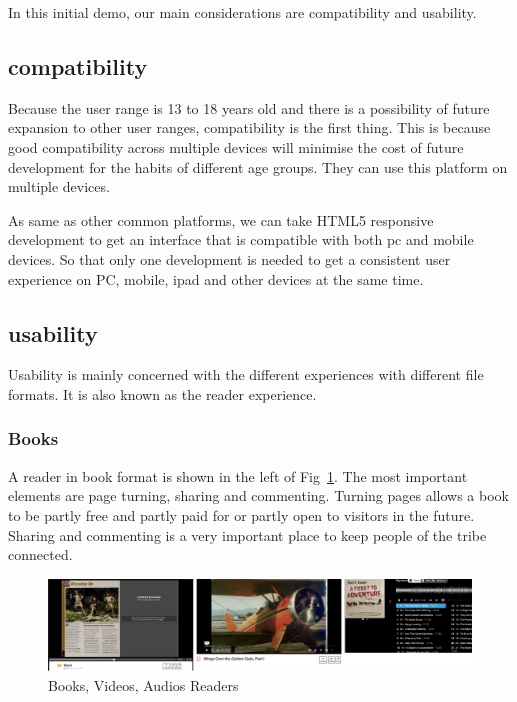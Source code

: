 In this initial demo, our main considerations are compatibility and usability.

\subsection{compatibility}

Because the user range is 13 to 18 years old and there is a possibility of future expansion to other user ranges, compatibility is the first thing. 
This is because good compatibility across multiple devices will minimise the cost of future development for the habits of different age groups.
They can use this platform on multiple devices.

As same as other common platforms, we can take HTML5 responsive development to get an interface that is compatible with both pc and mobile devices.
So that only one development is needed to get a consistent user experience on PC, mobile, ipad and other devices at the same time.

\subsection{usability}

Usability is mainly concerned with the different experiences with different file formats.
It is also known as the reader experience. 

\subsubsection{Books}

A reader in book format is shown in the left of Fig~\ref{fig31}.
The most important elements are page turning, sharing and commenting. 
Turning pages allows a book to be partly free and partly paid for or partly open to visitors in the future. 
Sharing and commenting is a very important place to keep people of the tribe connected. 

\begin{figure}[htbp]
  \centerline{\includegraphics[width=500pt]{images/Book.png}}
  \caption{Books, Videos, Audios Readers}
  \label{fig31}
\end{figure}

